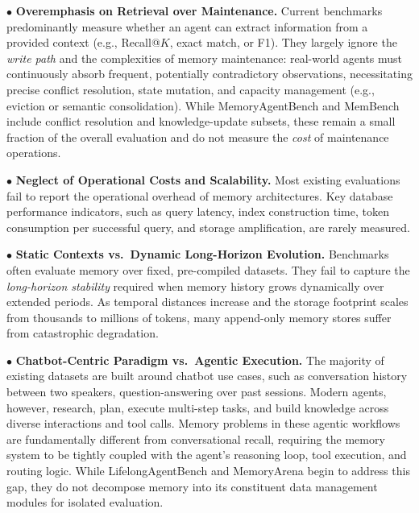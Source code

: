 \documentclass{llmxive}
\begin{document}
\noindent $\bullet$ \textbf{Overemphasis on Retrieval over Maintenance.} Current benchmarks predominantly measure whether an agent can extract information from a provided context (e.g., Recall@$K$, exact match, or F1). They largely ignore the \textit{write path} and the complexities of memory maintenance: real-world agents must continuously absorb frequent, potentially contradictory observations, necessitating precise conflict resolution, state mutation, and capacity management (e.g., eviction or semantic consolidation). While MemoryAgentBench and MemBench include conflict resolution and knowledge-update subsets, these remain a small fraction of the overall evaluation and do not measure the \textit{cost} of maintenance operations.

\noindent $\bullet$ \textbf{Neglect of Operational Costs and Scalability.} Most existing evaluations fail to report the operational overhead of memory architectures. Key database performance indicators, such as query latency, index construction time, token consumption per successful query, and storage amplification, are rarely measured. %

\noindent $\bullet$ \textbf{Static Contexts vs.\ Dynamic Long-Horizon Evolution.} Benchmarks often evaluate memory over fixed, pre-compiled datasets. They fail to capture the \textit{long-horizon stability} required when memory history grows dynamically over extended periods. As temporal distances increase and the storage footprint scales from thousands to millions of tokens, many append-only memory stores suffer from catastrophic degradation.

\noindent $\bullet$ \textbf{Chatbot-Centric Paradigm vs.\ Agentic Execution.} The majority of existing datasets are built around chatbot use cases, such as conversation history between two speakers, question-answering over past sessions. Modern agents, however, research, plan, execute multi-step tasks, and build knowledge across diverse interactions and tool calls. Memory problems in these agentic workflows are fundamentally different from conversational recall, requiring the memory system to be tightly coupled with the agent's reasoning loop, tool execution, and routing logic. While LifelongAgentBench and MemoryArena begin to address this gap, they do not decompose memory into its constituent data management modules for isolated evaluation.
\fi
\end{document}
